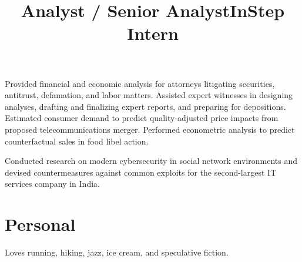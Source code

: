 \documentclass{res}
\begin{document}
\begin{resume}
    \title{Analyst / Senior Analyst}
    \begin{position}
        Provided financial and economic analysis for attorneys litigating securities, antitrust, defamation, and labor matters. Assisted expert witnesses in designing analyses, drafting and finalizing expert reports, and preparing for depositions. Estimated consumer demand to predict quality-adjusted price impacts from proposed telecommunications merger. Performed econometric analysis to predict counterfactual sales in food libel action.
    \end{position}

    \title{InStep Intern}
    \begin{position}
        Conducted research on modern cybersecurity in social network environments and devised countermeasures against common exploits for the second-largest IT services company in India.
    \end{position}





\section{Personal}
    Loves running, hiking, jazz, ice cream, and speculative fiction.

\end{resume}
\end{document}
